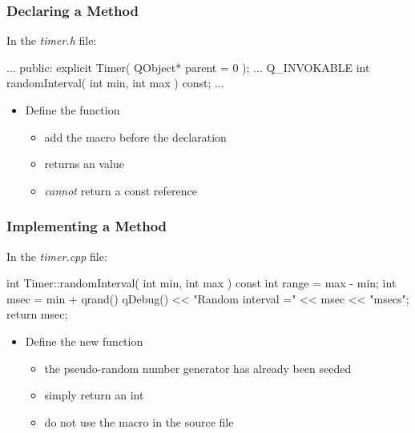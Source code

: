 \begin{slide}[fragile]\frametitle{Declaring a Method}

In the \textit{timer.h} file:

\vspace*{0.25em}
\begin{cpp}
...
public:
    explicit Timer( QObject* parent = 0 );
...
    Q_INVOKABLE int randomInterval( int min, int max ) const;
...
\end{cpp}

\begin{itemize}
\item Define the  function
  \begin{itemize}
  \item add the  macro before the declaration
  \item returns an  value
  \item \textit{cannot} return a const reference
  \end{itemize}
\end{itemize}

\end{slide}



\begin{slide}[fragile]\frametitle{Implementing a Method}

In the \textit{timer.cpp} file:

\vspace*{0.5em}
\begin{cpp}
int Timer::randomInterval( int min, int max ) const
{
    int range = max - min;
    int msec = min + qrand() %
    qDebug() << "Random interval =" << msec << "msecs";
    return msec;
}
\end{cpp}

\begin{itemize}
\item Define the new  function
  \begin{itemize}
  \item the pseudo-random number generator has already been seeded
  \item simply return an int
  \item do not use the  macro in the source file
  \end{itemize}
\end{itemize}

\end{slide}


